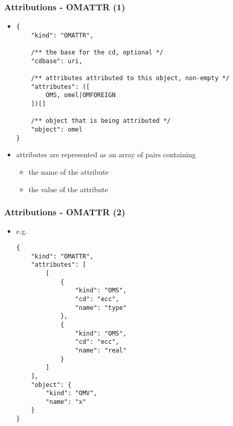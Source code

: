 \documentclass[usenames,dvipsnames]{beamer}
\begin{document}
\begin{frame}[fragile]
    \frametitle{Attributions - OMATTR (1)}
    \begin{itemize}
        \item
        \begin{lstlisting}
{
    "kind": "OMATTR", 

    /** the base for the cd, optional */
    "cdbase": uri, 

    /** attributes attributed to this object, non-empty */
    "attributes": ([
        OMS, omel|OMFOREIGN
    ])[]

    /** object that is being attributed */
    "object": omel
}
    \end{lstlisting}
        \item attributes are represented as an array of pairs containing
        \begin{itemize}
            \item the name of the attribute
            \item the value of the attribute
        \end{itemize}
    \end{itemize}
\end{frame}

\begin{frame}[fragile]
    \frametitle{Attributions - OMATTR (2)}
    \begin{itemize}
        \item e.g.
        \begin{lstlisting}
{
    "kind": "OMATTR",
    "attributes": [
        [
            {
                "kind": "OMS",
                "cd": "ecc",
                "name": "type"
            },
            {
                "kind": "OMS",
                "cd": "ecc",
                "name": "real"
            }
        ]
    ],
    "object": {
        "kind": "OMV",
        "name": "x"
    }
}
\end{lstlisting}
    \end{itemize}
\end{frame}
\end{document}
